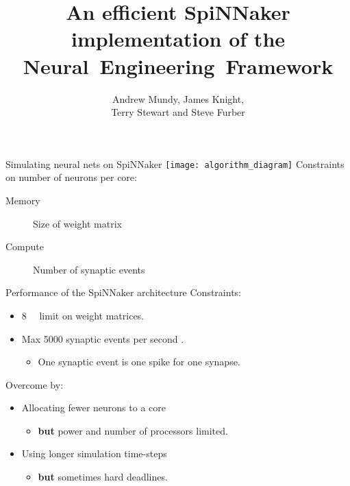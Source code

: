 \documentclass[t]{beamer}
\title{An efficient SpiNNaker implementation of the Neural~Engineering~Framework}
\author{Andrew Mundy, James Knight,\\Terry Stewart and Steve Furber}
\begin{document}
  \maketitle

  \begin{frame}{Simulating neural nets on SpiNNaker}
    \vfill
    \hspace*{-.15\textwidth}\texttt{[image: algorithm\_diagram]}
    \vfill
    \pause
    Constraints on number of neurons per core:
    \begin{description}
      \item[Memory] Size of weight matrix
      \item[Compute] Number of synaptic events
    \end{description}
  \end{frame}

  \begin{frame}{Performance of the SpiNNaker architecture}
    Constraints:
    \begin{itemize}
      \item \SI{8}{\mebi\byte} limit on weight matrices.
      \item Max \num{5000} synaptic events per second \parencite{Sharp2013}.
      \begin{itemize}
        \item One synaptic event is one spike for one synapse.
      \end{itemize}
    \end{itemize}

    \pause
    Overcome by:
    \begin{itemize}[<+->]
      \item Allocating fewer neurons to a core
        \begin{itemize}
          \item \textbf{but} power and number of processors limited.
        \end{itemize}
      \item Using longer simulation time-steps
        \begin{itemize}
          \item \textbf{but} sometimes hard deadlines.
        \end{itemize}
    \end{itemize}
  \end{frame}
\end{document}
